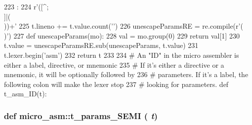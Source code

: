 \begin{DoxyCode}
223                       :
224     r'([^\n;\\]|(\\[\n;\\]))+'
225     t.lineno += t.value.count('\n')
226     unescapeParamsRE = re.compile(r'(\\[\n;\\])')
227     def unescapeParams(mo):
228         val = mo.group(0)
229         return val[1]
230     t.value = unescapeParamsRE.sub(unescapeParams, t.value)
231     t.lexer.begin('asm')
232     return t
233 
234 # An "ID" in the micro assembler is either a label, directive, or mnemonic
235 # If it's either a directive or a mnemonic, it will be optionally followed by
236 # parameters. If it's a label, the following colon will make the lexer stop
237 # looking for parameters.
def t_asm_ID(t):
\end{DoxyCode}
\hypertarget{namespacemicro__asm_a771bc622a40e7ad0bccc1715a303dff0}{
\subsubsection[{t\_\-params\_\-SEMI}]{\setlength{\rightskip}{0pt plus 5cm}def micro\_\-asm::t\_\-params\_\-SEMI ( {\em t})}}
\label{namespacemicro__asm_a771bc622a40e7ad0bccc1715a303dff0}





